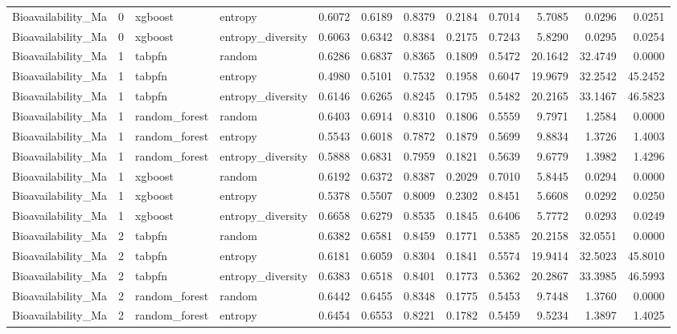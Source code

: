 \begin{tabular}{lrllrrrrrrrr}
Bioavailability_Ma & 0 & xgboost & entropy & 0.6072 & 0.6189 & 0.8379 & 0.2184 & 0.7014 & 5.7085 & 0.0296 & 0.0251 \\
Bioavailability_Ma & 0 & xgboost & entropy_diversity & 0.6063 & 0.6342 & 0.8384 & 0.2175 & 0.7243 & 5.8290 & 0.0295 & 0.0254 \\
Bioavailability_Ma & 1 & tabpfn & random & 0.6286 & 0.6837 & 0.8365 & 0.1809 & 0.5472 & 20.1642 & 32.4749 & 0.0000 \\
Bioavailability_Ma & 1 & tabpfn & entropy & 0.4980 & 0.5101 & 0.7532 & 0.1958 & 0.6047 & 19.9679 & 32.2542 & 45.2452 \\
Bioavailability_Ma & 1 & tabpfn & entropy_diversity & 0.6146 & 0.6265 & 0.8245 & 0.1795 & 0.5482 & 20.2165 & 33.1467 & 46.5823 \\
Bioavailability_Ma & 1 & random_forest & random & 0.6403 & 0.6914 & 0.8310 & 0.1806 & 0.5559 & 9.7971 & 1.2584 & 0.0000 \\
Bioavailability_Ma & 1 & random_forest & entropy & 0.5543 & 0.6018 & 0.7872 & 0.1879 & 0.5699 & 9.8834 & 1.3726 & 1.4003 \\
Bioavailability_Ma & 1 & random_forest & entropy_diversity & 0.5888 & 0.6831 & 0.7959 & 0.1821 & 0.5639 & 9.6779 & 1.3982 & 1.4296 \\
Bioavailability_Ma & 1 & xgboost & random & 0.6192 & 0.6372 & 0.8387 & 0.2029 & 0.7010 & 5.8445 & 0.0294 & 0.0000 \\
Bioavailability_Ma & 1 & xgboost & entropy & 0.5378 & 0.5507 & 0.8009 & 0.2302 & 0.8451 & 5.6608 & 0.0292 & 0.0250 \\
Bioavailability_Ma & 1 & xgboost & entropy_diversity & 0.6658 & 0.6279 & 0.8535 & 0.1845 & 0.6406 & 5.7772 & 0.0293 & 0.0249 \\
Bioavailability_Ma & 2 & tabpfn & random & 0.6382 & 0.6581 & 0.8459 & 0.1771 & 0.5385 & 20.2158 & 32.0551 & 0.0000 \\
Bioavailability_Ma & 2 & tabpfn & entropy & 0.6181 & 0.6059 & 0.8304 & 0.1841 & 0.5574 & 19.9414 & 32.5023 & 45.8010 \\
Bioavailability_Ma & 2 & tabpfn & entropy_diversity & 0.6383 & 0.6518 & 0.8401 & 0.1773 & 0.5362 & 20.2867 & 33.3985 & 46.5993 \\
Bioavailability_Ma & 2 & random_forest & random & 0.6442 & 0.6455 & 0.8348 & 0.1775 & 0.5453 & 9.7448 & 1.3760 & 0.0000 \\
Bioavailability_Ma & 2 & random_forest & entropy & 0.6454 & 0.6553 & 0.8221 & 0.1782 & 0.5459 & 9.5234 & 1.3897 & 1.4025 \\

\end{tabular}

